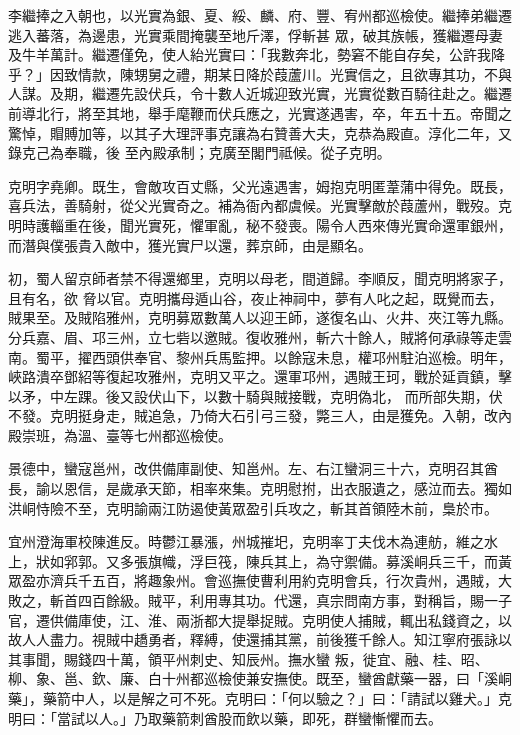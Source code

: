 \begin{pinyinscope}
 李繼捧之入朝也，以光實為銀、夏、綏、麟、府、豐、宥州都巡檢使。繼捧弟繼遷逃入蕃落，為邊患，光實乘間掩襲至地斤澤，俘斬甚
 眾，破其族帳，獲繼遷母妻及牛羊萬計。繼遷僅免，使人紿光實曰：「我數奔北，勢窘不能自存矣，公許我降乎？」因致情款，陳甥舅之禮，期某日降於葭蘆川。光實信之，且欲專其功，不與人謀。及期，繼遷先設伏兵，令十數人近城迎致光實，光實從數百騎往赴之。繼遷前導北行，將至其地，舉手麾鞭而伏兵應之，光實遂遇害，卒，年五十五。帝聞之驚悼，賵賻加等，以其子大理評事克讓為右贊善大夫，克恭為殿直。淳化二年，又錄克己為奉職，後
 至內殿承制；克廣至閣門祗候。從子克明。



 克明字堯卿。既生，會敵攻百丈縣，父光遠遇害，姆抱克明匿葦蒲中得免。既長，喜兵法，善騎射，從父光實奇之。補為衙內都虞候。光實擊敵於葭蘆州，戰歿。克明時護輜重在後，聞光實死，懼軍亂，秘不發喪。陽令人西來傳光實命還軍銀州，而潛與僕張貴入敵中，獲光實尸以還，葬京師，由是顯名。



 初，蜀人留京師者禁不得還鄉里，克明以母老，間道歸。李順反，聞克明將家子，且有名，欲
 脅以官。克明攜母遁山谷，夜止神祠中，夢有人叱之起，既覺而去，賊果至。及賊陷雅州，克明募眾數萬人以迎王師，遂復名山、火井、夾江等九縣。分兵嘉、眉、邛三州，立七砦以邀賊。復收雅州，斬六十餘人，賊將何承祿等走雲南。蜀平，擢西頭供奉官、黎州兵馬監押。以餘寇未息，權邛州駐泊巡檢。明年，峽路潰卒鄧紹等復起攻雅州，克明又平之。還軍邛州，遇賊王珂，戰於延貢鎮，擊以矛，中左踝。後又設伏山下，以數十騎與賊接戰，克明偽北，
 而所部失期，伏不發。克明挺身走，賊追急，乃倚大石引弓三發，斃三人，由是獲免。入朝，改內殿崇班，為溫、臺等七州都巡檢使。



 景德中，蠻寇邕州，改供備庫副使、知邕州。左、右江蠻洞三十六，克明召其酋長，諭以恩信，是歲承天節，相率來集。克明慰拊，出衣服遺之，感泣而去。獨如洪峒恃險不至，克明諭兩江防遏使黃眾盈引兵攻之，斬其首領陸木前，梟於市。



 宜州澄海軍校陳進反。時鬱江暴漲，州城摧圯，克明率丁夫伐木為連舫，維之水
 上，狀如郛郭。又多張旗幟，浮巨筏，陳兵其上，為守禦備。募溪峒兵三千，而黃眾盈亦濟兵千五百，將趣象州。會巡撫使曹利用約克明會兵，行次貴州，遇賊，大敗之，斬首四百餘級。賊平，利用專其功。代還，真宗問南方事，對稱旨，賜一子官，遷供備庫使，江、淮、兩浙都大提舉捉賊。克明使人捕賊，輒出私錢資之，以故人人盡力。視賊中趫勇者，釋縛，使還捕其黨，前後獲千餘人。知江寧府張詠以其事聞，賜錢四十萬，領平州刺史、知辰州。撫水蠻
 叛，徙宜、融、桂、昭、柳、象、邕、欽、廉、白十州都巡檢使兼安撫使。既至，蠻酋獻藥一器，曰「溪峒藥」，藥箭中人，以是解之可不死。克明曰：「何以驗之？」曰：「請試以雞犬。」克明曰：「當試以人。」乃取藥箭刺酋股而飲以藥，即死，群蠻慚懼而去。




\end{pinyinscope}

